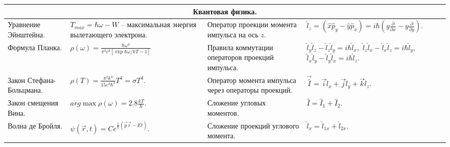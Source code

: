 \documentclass{article}
\begin{document}
\begin{tabular}{ |p{5cm}|p{4.5cm}|p{5cm}|p{4.5cm}|  }
\hline
\multicolumn{4}{|c|}{Квантовая физика.} \\
\hline
Уравнение Эйнштейна.                                                         &  %
$T_{max} = \hbar \omega - W$ -- максимальная энергия вылетающего электрона.  &  %
Оператор проекции момента импульса на ось $z$.                               &  %
$
\hat{l}_z = (\hat{x}\hat{p}_y - \hat{y}\hat{p}_x) = i \hbar 
\left( 
  y\frac{\partial}{\partial x} - y \frac{\partial}{\partial y} 
\right).
$                                                                            \\ %
\hline
Формула Планка.                                                              &  %
$
\rho(\omega) = 
\frac{\hbar \omega^3}{\pi^2 c^3 \left[ \exp \hbar\omega/kT - 1 \right]}
$                                                                            &  %
Правила коммутации операторов проекций импульса.                             &  %
$\hat{l}_y \hat{l}_z - \hat{l}_z \hat{l}_y = i \hbar \hat{l}_x,$ \newline
$\hat{l}_z \hat{l}_x - \hat{l}_x \hat{l}_z = i \hbar \hat{l}_y,$ \newline
$\hat{l}_x \hat{l}_y - \hat{l}_y \hat{l}_x = i \hbar \hat{l}_z.$             \\ %
\hline
Закон Стефана-Больцмана.                                                     &  %
$\rho(T) = \frac{\pi^2 k^4}{15 c^3 \hbar^3}T^4 = \sigma T^4.$                &  %
Оператор момента импульса через операторы проекций.                          &  %
$\vec{\hat{I}} = \vec{i} \hat{l}_x + \vec{j} \hat{l}_y + \vec{k} \hat{l}_z.$ \\ %
\hline
Закон смещения Вина.                                                         &  %
$arg\max \rho(\omega) = 2.8 \frac{kT}{\hbar}.$                               &  %
Сложение угловых моментов.                                                   &  %
$\hat{I} = \hat{I}_1 + \hat{I}_2.$                                           \\ %
\hline
Волна де Бройля.                                                             &  %
$\psi(\vec{r}, t) = Ce^{\frac{i}{\hbar} (\vec{p} \vec{r} - Et)}.$            &  %
Сложение проекций углового момента.                                          &  %
$\hat{l}_x = \hat{l}_{1x} + \hat{l}_{2x}.$                                   \\ %

\end{tabular}
\end{document}
